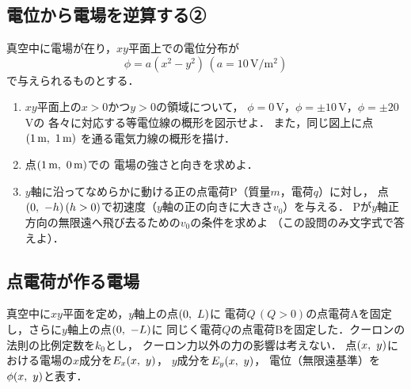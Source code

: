 \documentclass[fleqn,head_space=14mm,foot_space=15mm,gutter=10mm,fore_edge=10mm,
    twocolumn,jafontscale=0.92]{jlreq}
\begin{document}
\vspace{2cm}
\vfill

\subsection{電位から電場を逆算する②}

真空中に電場が在り，$xy$平面上での電位分布が
\[ \phi=a(x^2-y^2)\,(a=10\,\text{V/}\text{m}^2) \]
で与えられるものとする．

\begin{enumerate}
    
    \item $xy$平面上の$x>0$かつ$y>0$の領域について，
    $\phi=0$\,V，$\phi=\pm10$\,V，$\phi=\pm20$\,Vの
    各々に対応する等電位線の概形を図示せよ．
    また，同じ図上に点$(1\,\text{m}, \hspace{1.2mm}1\,\text{m})$
    を通る電気力線の概形を描け．

    \item 点$(1\,\text{m}, \hspace{1.2mm}0\,\text{m})$での
    電場の強さと向きを求めよ．

    \item $y$軸に沿ってなめらかに動ける正の点電荷P（質量$m$，電荷$q$）に対し，
    点$(0, \hspace{1.2mm}-h)\,(h>0)$で初速度（$y$軸の正の向きに大きさ$v_0$）を与える．
    Pが$y$軸正方向の無限遠へ飛び去るための$v_0$の条件を求めよ
    （この設問のみ文字式で答えよ）．

\end{enumerate}

\vspace{2cm}
\vfill

\subsection{点電荷が作る電場}

真空中に$xy$平面を定め，$y$軸上の点$(0, \hspace{1.2mm} L)$に
電荷$Q\,(Q>0)$の点電荷Aを固定し，さらに$y$軸上の点$(0, \hspace{1.2mm} -L)$に
同じく電荷$Q$の点電荷Bを固定した．クーロンの法則の比例定数を$k_0$とし，
クーロン力以外の力の影響は考えない．
点$(x, \hspace{1.2mm} y)$における電場の$x$成分を$E_x(x, \hspace{1.2mm} y)$，
$y$成分を$E_y(x, \hspace{1.2mm} y)$，
電位（無限遠基準）を$\phi(x, \hspace{1.2mm} y)$と表す．
\end{document}
